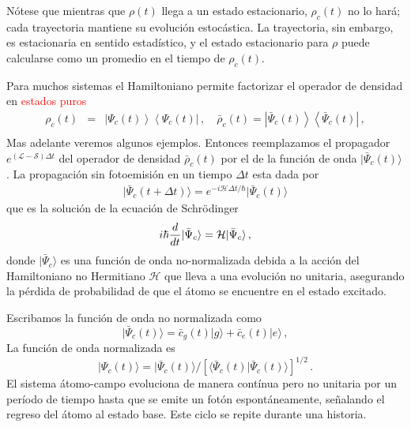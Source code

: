 \documentclass[twocolumn,aps,eqsecnum,showkeys,amsmath]{revtex4}
\newcommand{\mcH}{\mathcal{H}} 	%
\newcommand{\mcL}{\mathcal{L}}
\newcommand{\mcS}{\mathcal{S}}
\providecommand{\ket}[1]{\lvert #1 \rangle}
\providecommand{\braket}[2]{\langle #1 \rvert #2 \rangle}
\newcommand{\ketbra}[2]{\left| {#1} \right\rangle\left\langle {#2}\right|}
\begin{document}
N\'otese que mientras que $\rho (t)$ llega a un  estado estacionario, $\rho_c (t)$ 
no lo har\'a; cada trayectoria mantiene su evoluci\'on estoc\'astica. La trayectoria, 
sin embargo, es estacionaria en sentido estad\'istico, y el estado estacionario 
para $\rho$ puede calcularse como un promedio en el tiempo de $\rho_c (t)$. 

Para muchos sistemas el Hamiltoniano permite factorizar el operador 
de densidad en \textcolor{red}{estados puros}
%
\begin{eqnarray}
\rho_c (t) &=& \ketbra{\Psi_c (t) }{ \Psi_c  (t)} 	\,, 	\quad 
	\bar{\rho}_c (t) = \ketbra{ \bar{\Psi}_c (t) }{ \bar{\Psi}_c  (t)} \,, 
	\nonumber \\ 
\end{eqnarray}
Mas adelante veremos algunos ejemplos. Entonces reemplazamos el propagador 
$e^{ (\mcL - \mcS) \Delta t}$ del operador de densidad $\bar{\rho}_c (t)$ por el de 
la funci\'on de onda $| \bar{\Psi}_c (t) \rangle$. La propagaci\'on sin fotoemisi\'on 
en un tiempo $\Delta t$ esta dada por 
%
\begin{eqnarray}
\ket{ \bar{\Psi}_c (t+ \Delta t) } 
	= e^{- i \mcH \Delta t /\hbar} \ket{ \bar{\Psi}_c (t) } 
\end{eqnarray}
que es la soluci\'on de la ecuaci\'on de Schr\"odinger 
%
\begin{eqnarray}
i \hbar \frac{d}{dt} \ket{ \bar{\Psi}_c } = {\cal H} \ket{ \bar{\Psi}_c } \,,
\end{eqnarray}
donde $\ket{ \bar{\Psi}_c }$ es una funci\'on de onda no-normalizada 
debida a la acci\'on del Hamiltoniano no Hermitiano $\mcH$ que lleva 
a una evoluci\'on no unitaria, asegurando la p\'erdida de probabilidad 
de que el \'atomo se encuentre en el estado excitado. 

Escribamos la funci\'on de onda no normalizada como 
%
\begin{equation} 	\label{eq:2LA-WF-unnorm}
\ket{ \bar{\Psi}_c (t) } = \bar{c}_g(t) \ket{g} +\bar{c}_e(t) \ket{e} 	\,,
\end{equation}
La funci\'on de onda normalizada es 
%
\begin{equation} 	
\ket{ \Psi_c(t) } = \ket{ \bar{\Psi}_c(t) } / 
	[\braket{ \bar{\Psi}_c(t)}{ \bar{\Psi}_c(t)} ]^{1/2} \,.
\end{equation}
El sistema \'atomo-campo evoluciona de manera cont\'inua pero no 
unitaria por un per\'iodo de tiempo hasta que se emite un fot\'on 
espont\'aneamente, se\~nalando el regreso del \'atomo al estado 
base. Este ciclo se repite durante una historia. 
\end{document}
